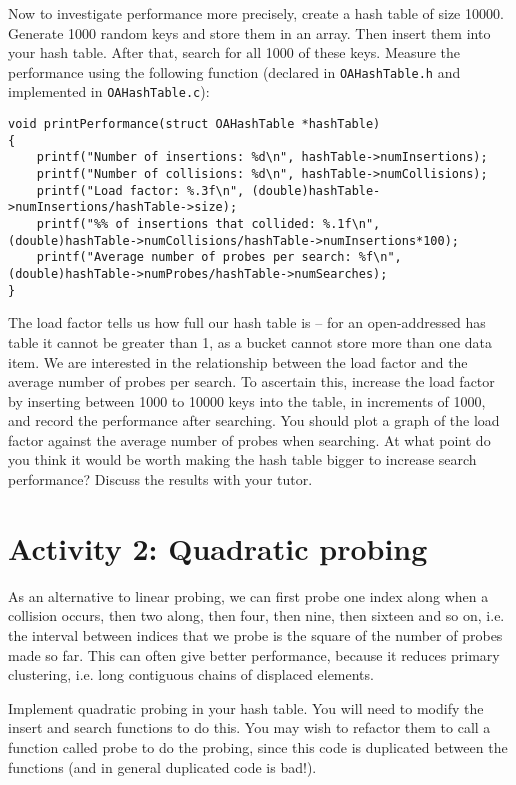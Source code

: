 \documentclass[10pt, a4paper, twosize]{article}
\begin{document}
Now to investigate performance more precisely, create a hash table of size 10000. Generate 1000 random keys and store them in an array. Then insert them into your hash table. After that, search for all 1000 of these keys. Measure the performance using the following function (declared in \texttt{OAHashTable.h} and implemented in \texttt{OAHashTable.c}):
\begin{lstlisting}
void printPerformance(struct OAHashTable *hashTable)
{
    printf("Number of insertions: %d\n", hashTable->numInsertions);
    printf("Number of collisions: %d\n", hashTable->numCollisions);
    printf("Load factor: %.3f\n", (double)hashTable->numInsertions/hashTable->size);
    printf("%% of insertions that collided: %.1f\n", (double)hashTable->numCollisions/hashTable->numInsertions*100);
    printf("Average number of probes per search: %f\n", (double)hashTable->numProbes/hashTable->numSearches);
}
\end{lstlisting}
The load factor tells us how full our hash table is -- for an open-addressed has table it cannot be greater than 1, as a bucket cannot store more than one data item. We are interested in the relationship between the load factor and the average number of probes per search. To ascertain this, increase the load factor by inserting between 1000 to 10000 keys into the table, in increments of 1000, and record the performance after searching. You should plot a graph of the load factor against the average number of probes when searching. At what point do you think it would be worth making the hash table bigger to increase search performance? Discuss the results with your tutor.

\section{Activity 2: Quadratic probing}
As an alternative to linear probing, we can first probe one index along when a collision occurs, then two along, then four, then nine, then sixteen and so on, i.e. the interval between indices that we probe is the square of the number of probes made so far. This can often give better performance, because it reduces primary clustering, i.e. long contiguous chains of displaced elements.

Implement quadratic probing in your hash table. You will need to modify the insert and search functions to do this. You may wish to refactor them to call a function called probe to do the probing, since this code is duplicated between the functions (and in general duplicated code is bad!).
\end{document}
